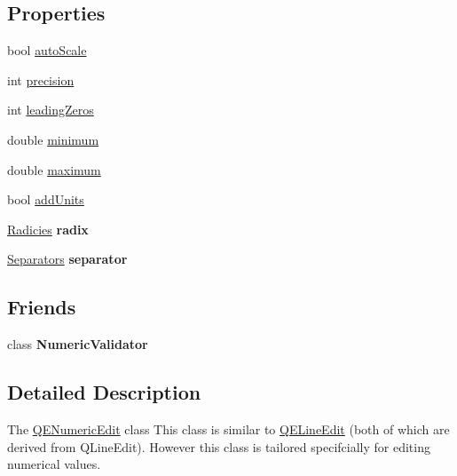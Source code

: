 \subsection*{Properties}
\begin{DoxyCompactItemize}
\item 
bool \hyperlink{classQENumericEdit_a9365903ab264ec3b9b52968741569203}{autoScale}
\item 
int \hyperlink{classQENumericEdit_a005bc482d26e66ecb9936abca60f5c63}{precision}
\item 
int \hyperlink{classQENumericEdit_ab1c01d3e9bc7cc98b07ebdad3cd18053}{leadingZeros}
\item 
double \hyperlink{classQENumericEdit_ad23a555e16ec2dc0c3ba1df5e7801bf2}{minimum}
\item 
double \hyperlink{classQENumericEdit_a75a9a0d20f9a2065356cc6bf786a90af}{maximum}
\item 
bool \hyperlink{classQENumericEdit_a826c1b66339d9a850523723e9a919c3f}{addUnits}
\item 
\hypertarget{classQENumericEdit_a4a0e103be177d90223a8f9b69dbdb166}{
\hyperlink{classQENumericEdit_a147ff9d9e547fe10391849a89f359223}{Radicies} {\bfseries radix}}
\label{classQENumericEdit_a4a0e103be177d90223a8f9b69dbdb166}

\item 
\hypertarget{classQENumericEdit_a001b74ebaeae5f5ac9b5210188fb3811}{
\hyperlink{classQENumericEdit_a42cabb099c034289576897ac0d8e89e0}{Separators} {\bfseries separator}}
\label{classQENumericEdit_a001b74ebaeae5f5ac9b5210188fb3811}

\end{DoxyCompactItemize}
\subsection*{Friends}
\begin{DoxyCompactItemize}
\item 
\hypertarget{classQENumericEdit_a94e74f438738f8747cf4d3e34729019a}{
class {\bfseries NumericValidator}}
\label{classQENumericEdit_a94e74f438738f8747cf4d3e34729019a}

\end{DoxyCompactItemize}


\subsection{Detailed Description}
The \hyperlink{classQENumericEdit}{QENumericEdit} class This class is similar to \hyperlink{classQELineEdit}{QELineEdit} (both of which are derived from QLineEdit). However this class is tailored specifcially for editing numerical values. 


